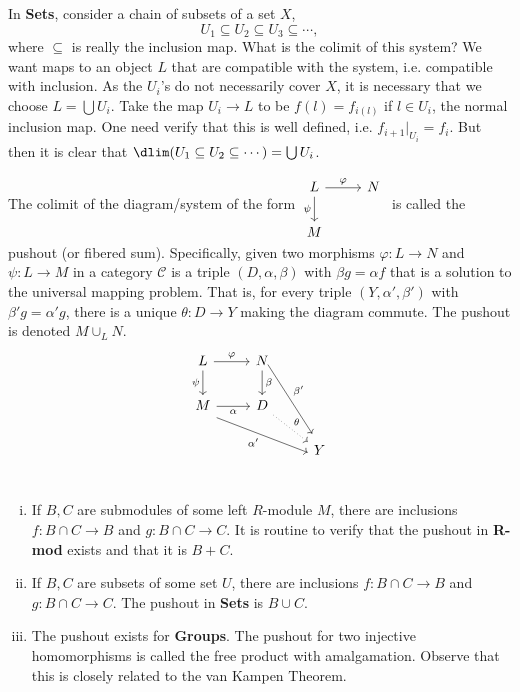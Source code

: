 \begin{ex}
In \textbf{Sets}, consider a chain of subsets of a set $X$,
	\[
	U_1 \subseteq U_2 \subseteq U_3 \subseteq \cdots,
	\]
where $\subseteq$ is really the inclusion map. What is the colimit of this system? We want maps to an object $L$ that are compatible with the system, i.e. compatible with inclusion. As the $U_i$'s do not necessarily cover $X$, it is necessary that we choose $L=\bigcup U_i$. Take the map $U_i \to L$ to be $f(l)=f_{i(l)}$ if $l \in U_i$, the normal inclusion map. One need verify that this is well defined, i.e. $f_{i+1} \big|_{U_i}=f_i$. But then it is clear that $\dlim (U_1 \subseteq U_2 \subseteq \cdots)= \bigcup U_i$. \xqed
\end{ex}


\begin{ex}[Pushout]
The colimit of the diagram/system of the form $\begin{tikzcd} L \arrow{r}{\varphi} \arrow[swap]{d}{\psi} & N \\ M & \end{tikzcd}$ is called the pushout (or fibered sum). Specifically, given two morphisms $\varphi: L \to N$ and $\psi: L \to M$ in a category $\mathcal{C}$ is a triple $(D,\alpha,\beta)$ with $\beta g=\alpha f$ that is a solution to the universal mapping problem. That is, for every triple $(Y,\alpha',\beta')$ with $\beta' g=\alpha' g$, there is a unique $\theta: D \to Y$ making the diagram commute. The pushout is denoted $M \cup_L N$. 
	\[
	\begin{tikzcd}
	L \arrow{r}{\varphi} \arrow[swap]{d}{\psi} & N \arrow{d}{\beta} \arrow[yshift=1ex]{ddr}{\beta'} &  \\
	M \arrow[swap]{r}{\alpha} \arrow[swap,yshift= -1ex]{drr}{\alpha'} & D \arrow[dotted]{dr}{\theta} &  \\
 	&  & Y \\
	\end{tikzcd}
	\] \xqed
\end{ex}


\begin{ex} \hfill
	\begin{enumerate}[(i)]
	\item If $B,C$ are submodules of some left $R$-module $M$, there are inclusions $f: B \cap C \to B$ and $g: B \cap C \to C$. It is routine to verify that the pushout in \textbf{R-mod} exists and that it is $B+C$. 
	\item If $B,C$ are subsets of some set $U$, there are inclusions $f: B \cap C \to B$ and $g: B \cap C \to C$. The pushout in \textbf{Sets} is $B \cup C$. 
	\item The pushout exists for \textbf{Groups}. The pushout for two injective homomorphisms is called the free product with amalgamation. Observe that this is closely related to the van Kampen Theorem. 
	\end{enumerate} \xqed
\end{ex}


